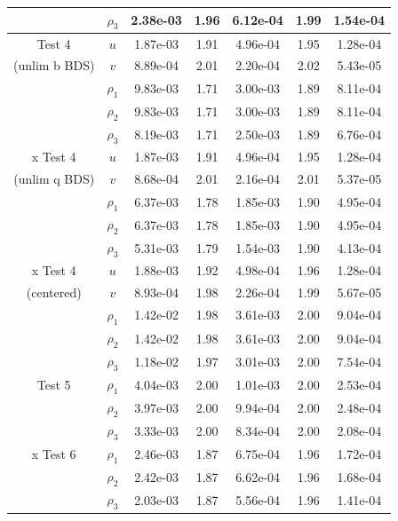 \documentclass[final]{siamltex}
\begin{document}
\begin{table}[h]
\begin{center}
\begin{tabular}{ccccccc}
                    & $\rho_3$ & 2.38e-03 & 1.96 & 6.12e-04 & 1.99 & 1.54e-04 \\
\hline
Test 4              & $u$      & 1.87e-03 & 1.91 & 4.96e-04 & 1.95 & 1.28e-04 \\
(unlim b BDS)       & $v$      & 8.89e-04 & 2.01 & 2.20e-04 & 2.02 & 5.43e-05 \\
                    & $\rho_1$ & 9.83e-03 & 1.71 & 3.00e-03 & 1.89 & 8.11e-04 \\
                    & $\rho_2$ & 9.83e-03 & 1.71 & 3.00e-03 & 1.89 & 8.11e-04 \\
                    & $\rho_3$ & 8.19e-03 & 1.71 & 2.50e-03 & 1.89 & 6.76e-04 \\
\hline
x Test 4            & $u$      & 1.87e-03 & 1.91 & 4.96e-04 & 1.95 & 1.28e-04 \\
(unlim q BDS)       & $v$      & 8.68e-04 & 2.01 & 2.16e-04 & 2.01 & 5.37e-05 \\
                    & $\rho_1$ & 6.37e-03 & 1.78 & 1.85e-03 & 1.90 & 4.95e-04 \\
                    & $\rho_2$ & 6.37e-03 & 1.78 & 1.85e-03 & 1.90 & 4.95e-04 \\
                    & $\rho_3$ & 5.31e-03 & 1.79 & 1.54e-03 & 1.90 & 4.13e-04 \\
\hline
x Test 4            & $u$      & 1.88e-03 & 1.92 & 4.98e-04 & 1.96 & 1.28e-04 \\
(centered)          & $v$      & 8.93e-04 & 1.98 & 2.26e-04 & 1.99 & 5.67e-05 \\
                    & $\rho_1$ & 1.42e-02 & 1.98 & 3.61e-03 & 2.00 & 9.04e-04 \\
                    & $\rho_2$ & 1.42e-02 & 1.98 & 3.61e-03 & 2.00 & 9.04e-04 \\
                    & $\rho_3$ & 1.18e-02 & 1.97 & 3.01e-03 & 2.00 & 7.54e-04 \\
\hline
Test 5              & $\rho_1$ & 4.04e-03 & 2.00 & 1.01e-03 & 2.00 & 2.53e-04 \\
                    & $\rho_2$ & 3.97e-03 & 2.00 & 9.94e-04 & 2.00 & 2.48e-04 \\
                    & $\rho_3$ & 3.33e-03 & 2.00 & 8.34e-04 & 2.00 & 2.08e-04 \\
\hline
x Test 6            & $\rho_1$ & 2.46e-03 & 1.87 & 6.75e-04 & 1.96 & 1.72e-04 \\
                    & $\rho_2$ & 2.42e-03 & 1.87 & 6.62e-04 & 1.96 & 1.68e-04 \\
                    & $\rho_3$ & 2.03e-03 & 1.87 & 5.56e-04 & 1.96 & 1.41e-04 \\

\end{tabular}
\end{center}
\end{table}
\end{document}
